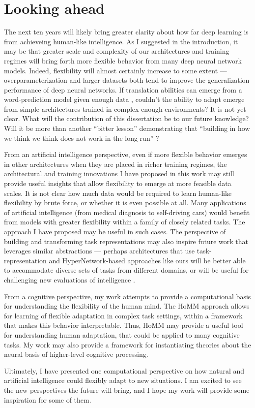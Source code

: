 \section{Looking ahead}

The next ten years will likely bring greater clarity about how far deep learning is from achieveing human-like intelligence. As I suggested in the introduction, it may be that greater scale and complexity of our architectures and training regimes will bring forth more flexible behavior from many deep neural network models. Indeed, flexibility will almost certainly increase to some extent --- overparameterization and larger datasets both tend to improve the generalization performance of deep neural networks. If translation abilities can emerge from a word-prediction model given enough data \citep{Radford2019, Brown2020}, couldn't the ability to adapt emerge from simple architectures trained in complex enough environments? It is not yet clear. What will the contribution of this dissertation be to our future knowledge? Will it be more than another ``bitter lesson'' demonstrating that ``building in how we think we think does not work in the long run'' \citep{Sutton2019}? \par 

From an artificial intelligence perspective, even if more flexible behavior emerges in other architectures when they are placed in richer training regimes, the architectural and training innovations I have proposed in this work may still provide useful insights that allow flexibility to emerge at more feasible data scales. It is not clear how much data would be required to learn human-like flexibility by brute force, or whether it is even possible at all. Many applications of artificial intelligence (from medical diagnosis to self-driving cars) would benefit from models with greater flexibility within a family of closely related tasks. The approach I have proposed may be useful in such cases. The perspective of building and transforming task representations may also inspire future work that leverages similar abstractions --- perhaps architectures that use task-representation and HyperNetwork-based approaches like ours will be better able to accommodate diverse sets of tasks from different domains, or will be useful for challenging new evaluations of intelligence \citep[e.g.][]{Chollet2019}. \par 

From a cognitive perspective, my work attempts to provide a computational basis for understanding the flexibility of the human mind. The HoMM approach allows for learning of flexible adaptation in complex task settings, within a framework that makes this behavior interpretable. Thus, HoMM may provide a useful tool for understanding human adaptation, that could be applied to many cognitive tasks. My work may also provide a framework for instantiating theories about the neural basis of higher-level cognitive processing. \par 

Ultimately, I have presented one computational perspective on how natural and artificial intelligence could flexibly adapt to new situations. I am excited to see the new perspectives the future will bring, and I hope my work will provide some inspiration for some of them. 
